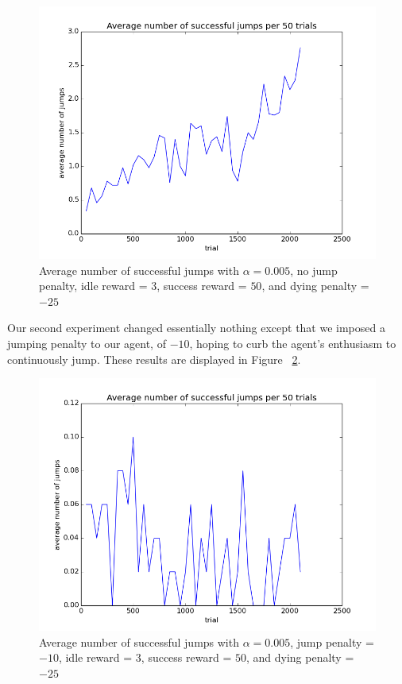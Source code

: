 \documentclass{scrartcl}
\begin{document}
    \begin{figure}[H]
        \centering
        \includegraphics[width=\textwidth]{../avgJumps1}
        \caption{Average number of successful jumps with $\alpha = 0.005$, no
        jump penalty, idle reward = $3$, success reward = $50$, and dying
        penalty = $-25$}
        \label{fig:exp1}
    \end{figure}

    Our second experiment changed essentially nothing except that we imposed a
    jumping penalty to our agent, of $-10$, hoping to curb the agent's
    enthusiasm to continuously jump. These results are displayed in Figure~
    \ref{fig:exp2}.

    \begin{figure}[H]
        \includegraphics[width=\textwidth]{../avgJumps2}
        \caption{Average number of successful jumps with $\alpha = 0.005$,
        jump penalty = $-10$, idle reward = $3$, success reward = $50$, and
        dying penalty = $-25$}
        \label{fig:exp2}
    \end{figure}
\end{document}
